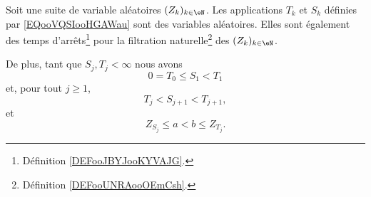 \begin{proposition}	\label{PROPooTYOAooEsoEPH}
	Soit une suite de variable aléatoires \( (Z_k)_{k\in \eN}\). Les applications \( T_k\) et \( S_k\) définies par \eqref{EQooVQSIooHGAWau} sont des variables aléatoires. Elles sont également des temps d'arrêts\footnote{Définition \ref{DEFooJBYJooKYVAJG}.} pour la filtration naturelle\footnote{Définition \ref{DEFooUNRAooOEmCsh}.} des \( (Z_k)_{k\in \eN}\).

	De plus, tant que \( S_j,T_j<\infty\) nous avons
	\begin{equation}		\label{EQooTFZKooPeJtgg}
		0=T_0\leq S_1<T_1
	\end{equation}
	et, pour tout \( j\geq 1\),
	\begin{equation}		\label{EQooCOUAooSgWEmf}
		T_j<S_{j+1}<T_{j+1},
	\end{equation}
	et
	\begin{equation}		\label{EQooUNTOooXbDmWr}
		Z_{S_j}\leq a<b\leq Z_{T_j}.
	\end{equation}
\end{proposition}


